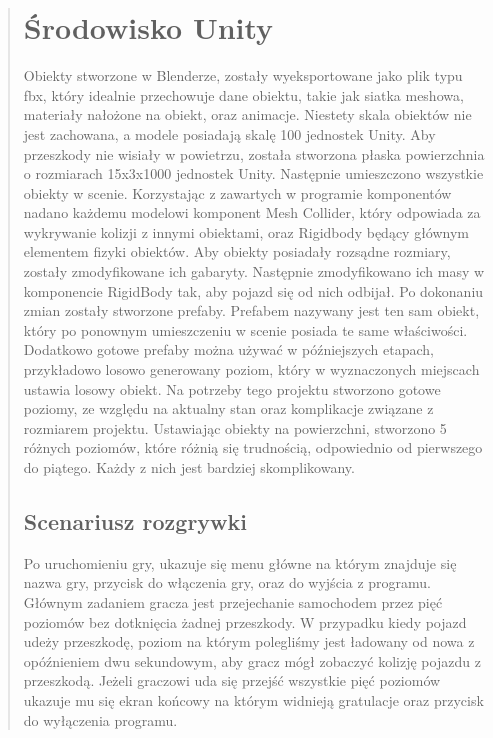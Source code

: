 \begin{quotation}
\section{Środowisko Unity}
\indent Obiekty stworzone w Blenderze, zostały wyeksportowane jako plik typu fbx, który idealnie przechowuje dane obiektu, takie jak siatka meshowa, materiały nałożone na obiekt, oraz animacje. Niestety skala obiektów nie jest zachowana, a modele posiadają skalę 100 jednostek Unity. Aby przeszkody nie wisiały w powietrzu, została stworzona płaska powierzchnia o rozmiarach 15x3x1000 jednostek Unity. Następnie umieszczono wszystkie obiekty w scenie. Korzystając z zawartych w programie komponentów nadano każdemu modelowi komponent Mesh Collider, który odpowiada za wykrywanie kolizji z innymi obiektami, oraz Rigidbody będący głównym elementem fizyki obiektów. Aby obiekty posiadały rozsądne rozmiary, zostały zmodyfikowane ich gabaryty. Następnie zmodyfikowano ich masy w komponencie RigidBody tak, aby pojazd się od nich odbijał. Po dokonaniu zmian zostały stworzone prefaby. Prefabem nazywany jest ten sam obiekt, który po ponownym umieszczeniu w scenie posiada te same właściwości. Dodatkowo gotowe prefaby można używać w późniejszych etapach, przykładowo losowo generowany poziom, który w wyznaczonych miejscach ustawia losowy obiekt. Na potrzeby tego projektu stworzono gotowe poziomy, ze względu na aktualny stan oraz komplikacje związane z rozmiarem projektu. Ustawiając obiekty na powierzchni, stworzono 5 różnych poziomów, które różnią się trudnością, odpowiednio od pierwszego do piątego. Każdy z nich jest bardziej skomplikowany. 


\newpage
\subsection{Scenariusz rozgrywki}
\indent Po uruchomieniu gry, ukazuje się menu główne na którym znajduje się nazwa gry, przycisk do włączenia gry, oraz do wyjścia z programu. Głównym zadaniem gracza jest przejechanie samochodem przez pięć poziomów bez dotknięcia żadnej przeszkody. W przypadku kiedy pojazd udeży przeszkodę, poziom na którym polegliśmy jest ładowany od nowa z opóźnieniem dwu sekundowym, aby gracz mógł zobaczyć kolizję pojazdu z przeszkodą. Jeżeli graczowi uda się przejść wszystkie pięć poziomów ukazuje mu się ekran końcowy na którym widnieją gratulacje oraz przycisk do wyłączenia programu.


\end{quotation}
